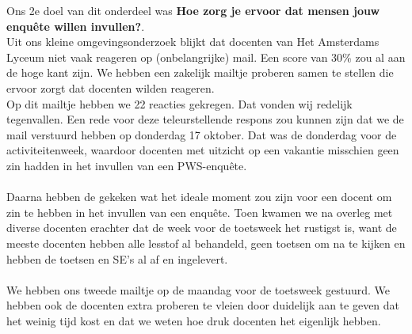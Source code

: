 \documentclass[12pt]{article}
\begin{document}
\begin{multicols}{2}
Ons 2e doel van dit onderdeel was \textbf{Hoe zorg je ervoor dat mensen jouw enquête willen invullen?}.\\
Uit ons kleine omgevingsonderzoek blijkt dat docenten van Het Amsterdams Lyceum niet vaak reageren op (onbelangrijke) mail. Een score van 30\% zou al aan de hoge kant zijn. We hebben een zakelijk mailtje proberen samen te stellen die ervoor zorgt dat docenten wilden reageren. \\
Op dit mailtje hebben we 22 reacties gekregen. Dat vonden wij redelijk tegenvallen.
Een rede voor deze teleurstellende respons zou kunnen zijn dat we de mail verstuurd hebben op donderdag 17 oktober. Dat was de donderdag voor de activiteitenweek, waardoor docenten met uitzicht op een vakantie misschien geen zin hadden in het invullen van een PWS-enquête.\\
\\
Daarna hebben de gekeken wat het ideale moment zou zijn voor een docent om zin te hebben in het invullen van een enquête. Toen kwamen we na overleg met diverse docenten erachter dat de week voor de toetsweek het rustigst is, want de meeste docenten hebben alle lesstof al behandeld, geen toetsen om na te kijken en hebben de toetsen en SE's al af en ingelevert.  \\
\\
We hebben ons tweede mailtje op de maandag voor de toetsweek gestuurd. We hebben ook de docenten extra proberen te vleien door duidelijk aan te geven dat het weinig tijd kost en dat we weten hoe druk docenten het eigenlijk hebben.
\fbox{\begin{minipage}{\linewidth}
    

\end{minipage}}
\end{multicols}
\end{document}
